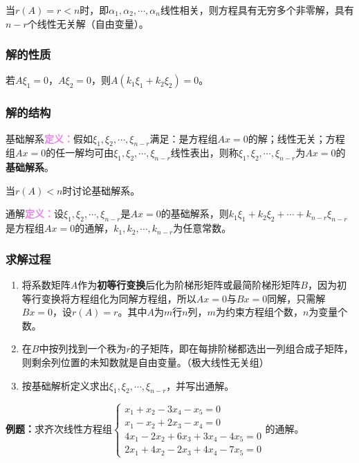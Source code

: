 \documentclass[UTF8, 12pt]{ctexart}
\begin{document}
当$r(A)=r<n$时，即$\alpha_1,\alpha_2,\cdots,\alpha_n$线性相关，则方程具有无穷多个非零解，具有$n-r$个线性无关解（自由变量）。

\subsubsection{解的性质}

若$A\xi_1=0$，$A\xi_2=0$，则$A(k_1\xi_1+k_2\xi_2)=0$。

\subsubsection{解的结构}

基础解系\textcolor{violet}{\textbf{定义：}}假如$\xi_1,\xi_2,\cdots,\xi_{n-r}$满足：是方程组$Ax=0$的解；线性无关；方程组$Ax=0$的任一解均可由$\xi_1,\xi_2,\cdots,\xi_{n-r}$线性表出，则称$\xi_1,\xi_2,\cdots,\xi_{n-r}$为$Ax=0$的\textbf{基础解系}。

当$r(A)<n$时讨论基础解系。

通解\textcolor{violet}{\textbf{定义：}}设$\xi_1,\xi_2,\cdots,\xi_{n-r}$是$Ax=0$的基础解系，则$k_1\xi_1+k_2\xi_2+\cdots+k_{n-r}\xi_{n-r}$是方程组$Ax=0$的通解，$k_1,k_2,\cdots,k_{n-r}$为任意常数。

\subsubsection{求解过程}

\begin{enumerate}
\item 将系数矩阵$A$作为\textbf{初等行变换}后化为阶梯形矩阵或最简阶梯形矩阵$B$，因为初等行变换将方程组化为同解方程组，所以$Ax=0$与$Bx=0$同解，只需解$Bx=0$，设$r(A)=r$。其中$A$为$m$行$n$列，$m$为约束方程组个数，$n$为变量个数。
\item 在$B$中按列找到一个秩为$r$的子矩阵，即在每排阶梯都选出一列组合成子矩阵，则剩余列位置的未知数就是自由变量。（极大线性无关组）
\item 按基础解析定义求出$\xi_1,\xi_2,\cdots,\xi_{n-r}$，并写出通解。
\end{enumerate}

\textbf{例题：}求齐次线性方程组$\left\{\begin{array}{l}
x_1+x_2-3x_4-x_5=0 \\
x_1-x_2+2x_3-x_4=0 \\
4x_1-2x_2+6x_3+3x_4-4x_5=0 \\
2x_1+4x_2-2x_3+4x_4-7x_5=0
\end{array}\right.$的通解。
\end{document}
